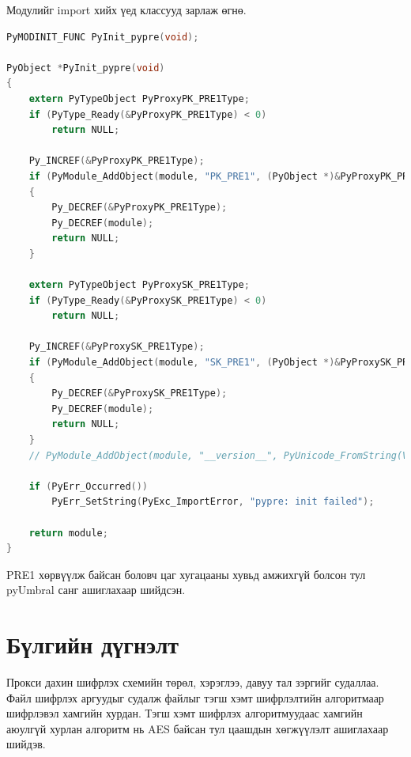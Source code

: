 \noindent Модулийг import хийх үед классууд зарлаж өгнө.

\begin{lstlisting}[language=C, caption={Модуль нь init хийхэд зарлах классууд}, captionpos=b]
PyMODINIT_FUNC PyInit_pypre(void);

PyObject *PyInit_pypre(void)
{
    extern PyTypeObject PyProxyPK_PRE1Type;
    if (PyType_Ready(&PyProxyPK_PRE1Type) < 0)
        return NULL;

    Py_INCREF(&PyProxyPK_PRE1Type);
    if (PyModule_AddObject(module, "PK_PRE1", (PyObject *)&PyProxyPK_PRE1Type) < 0)
    {
        Py_DECREF(&PyProxyPK_PRE1Type);
        Py_DECREF(module);
        return NULL;
    }

    extern PyTypeObject PyProxySK_PRE1Type;
    if (PyType_Ready(&PyProxySK_PRE1Type) < 0)
        return NULL;

    Py_INCREF(&PyProxySK_PRE1Type);
    if (PyModule_AddObject(module, "SK_PRE1", (PyObject *)&PyProxySK_PRE1Type) < 0)
    {
        Py_DECREF(&PyProxySK_PRE1Type);
        Py_DECREF(module);
        return NULL;
    }
    // PyModule_AddObject(module, "__version__", PyUnicode_FromString(VERSION));

    if (PyErr_Occurred())
        PyErr_SetString(PyExc_ImportError, "pypre: init failed");

    return module;
}
\end{lstlisting}

\noindent PRE1 хөрвүүлж байсан боловч цаг хугацааны хувьд амжихгүй болсон тул pyUmbral санг ашиглахаар шийдсэн.

\section{Бүлгийн дүгнэлт}
Прокси дахин шифрлэх схемийн төрөл, хэрэглээ, давуу тал зэргийг судаллаа. Файл шифрлэх аргуудыг судалж файлыг тэгш хэмт шифрлэлтийн алгоритмаар шифрлэвэл хамгийн хурдан. Тэгш хэмт шифрлэх алгоритмуудаас хамгийн аюулгүй хурлан алгоритм нь AES байсан тул цаашдын хөгжүүлэлт ашиглахаар шийдэв.